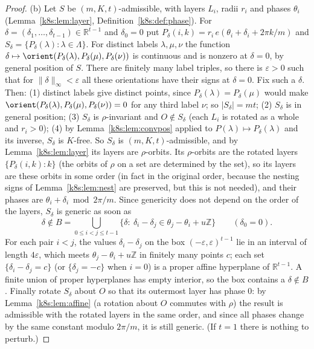 \begin{proof}
(b) Let $S$ be $(m,K,t)$-admissible, with layers $L_i$, radii $r_i$ and phases $\theta_i$ (Lemma~\ref{k8s:lem:layer},
Definition~\ref{k8s:def:phase}). For $\delta=(\delta_1,\dots,\delta_{t-1})\in\mathbb R^{t-1}$ and $\delta_0=0$ put
$P_\delta(i,k)=r_i\,e(\theta_i+\delta_i+2\pi k/m)$ and $S_\delta=\{P_\delta(\lambda):\lambda\in\Lambda\}$. For distinct labels
$\lambda,\mu,\nu$ the function $\delta\mapsto\orient(P_\delta(\lambda),P_\delta(\mu),P_\delta(\nu))$ is continuous and is
nonzero at $\delta=0$, by general position of $S$. There are finitely many label triples, so there is $\varepsilon>0$
such that for $\|\delta\|_\infty<\varepsilon$ all these orientations have their signs at $\delta=0$. Fix such a
$\delta$. Then:
(1) distinct labels give distinct points, since $P_\delta(\lambda)=P_\delta(\mu)$ would make
$\orient(P_\delta(\lambda),P_\delta(\mu),P_\delta(\nu))=0$ for any third label $\nu$; so $|S_\delta|=mt$;
(2) $S_\delta$ is in general position;
(3) $S_\delta$ is $\rho$-invariant and $O\notin S_\delta$ (each $L_i$ is rotated as a whole and $r_i>0$);
(4) by Lemma~\ref{k8s:lem:convpos} applied to $P(\lambda)\mapsto P_\delta(\lambda)$ and its inverse, $S_\delta$ is $K$-free.
So $S_\delta$ is $(m,K,t)$-admissible, and by Lemma~\ref{k8s:lem:layer} its layers are $\rho$-orbits. Its $\rho$-orbits
are the rotated layers $\{P_\delta(i,k):k\}$ (the orbits of $\rho$ on a set are determined by the set), so its layers
are these orbits in some order (in fact in the original order, because the nesting signs of Lemma~\ref{k8s:lem:nest}
are preserved, but this is not needed), and their phases are $\theta_i+\delta_i\bmod 2\pi/m$. Since genericity does not
depend on the order of the layers, $S_\delta$ is generic as soon as
\[
\delta\notin B=\bigcup_{0\le i<j\le t-1}\{\delta:\ \delta_i-\delta_j\in\theta_j-\theta_i+u\mathbb Z\}\qquad(\delta_0=0).
\]
For each pair $i<j$, the values $\delta_i-\delta_j$ on the box $(-\varepsilon,\varepsilon)^{t-1}$ lie in an interval of
length $4\varepsilon$, which meets $\theta_j-\theta_i+u\mathbb Z$ in finitely many points $c$; each set
$\{\delta_i-\delta_j=c\}$ (or $\{\delta_j=-c\}$ when $i=0$) is a proper affine hyperplane of $\mathbb R^{t-1}$. A finite
union of proper hyperplanes has empty interior, so the box contains a $\delta\notin B$. Finally rotate $S_\delta$ about
$O$ so that its outermost layer has phase $0$: by Lemma~\ref{k8s:lem:affine} (a rotation about $O$ commutes with $\rho$)
the result is admissible with the rotated layers in the same order, and since all phases change by the same constant
modulo $2\pi/m$, it is still generic. (If $t=1$ there is nothing to perturb.)
\end{proof}

